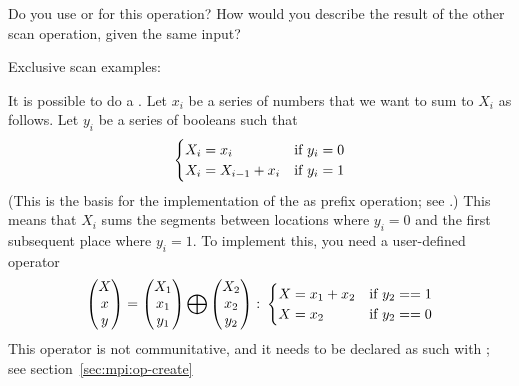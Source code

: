 \begin{exercise}
  Do you use  or  for this operation? How
  would you describe the result of the other scan operation, given the
  same input?
\end{exercise}

Exclusive scan examples:
%
%

It is possible to do a . Let $x_i$ be a series of numbers
that we want to sum to $X_i$ as follows. Let $y_i$ be a series of booleans such that
\[ 
\begin{cases}
  X_i=x_i&\hbox{if $y_i=0$}\\
  X_i=X_{i-1}+x_i&\hbox{if $y_i=1$}
\end{cases}
\]
(This is the basis for the implementation of the 
as prefix operation; see .)
This means that $X_i$ sums the segments between locations where $y_i=0$ and the
first subsequent place where $y_i=1$. To implement this, you need a user-defined operator
\[ 
\begin{pmatrix}  X\\ x\\ y\end{pmatrix}
=
\begin{pmatrix}  X_1\\ x_1\\ y_1\end{pmatrix}
\bigoplus
\begin{pmatrix}  X_2\\ x_2\\ y_2\end{pmatrix}\colon
  \begin{cases}
    X=x_1+x_2&\hbox{if $y_2==1$}\\ X=x_2&\hbox{if $y_2==0$}
  \end{cases}
\]
This operator is not communitative, and it needs to be declared as such
with ; see section~\ref{sec:mpi:op-create}


